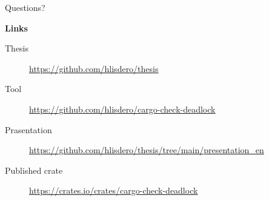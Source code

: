 \documentclass{beamer}
\begin{document}
\begin{frame}{}
  \huge
  \centering
  Questions?


  \vfill
  \raggedright
  \normalsize
  \textbf{Links}
  
  \scriptsize

  \begin{description}
    \item [Thesis] \url{https://github.com/hlisdero/thesis}
    \item [Tool] \url{https://github.com/hlisdero/cargo-check-deadlock}
    \item [Prasentation] \url{https://github.com/hlisdero/thesis/tree/main/presentation_en}
    \item [Published crate] \url{https://crates.io/crates/cargo-check-deadlock}
  \end{description}
\end{frame}
\end{document}
